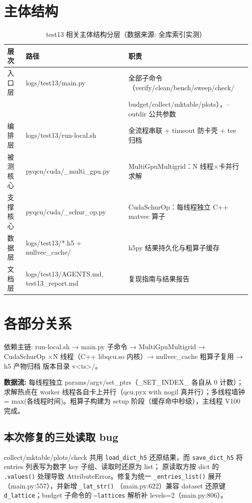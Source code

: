 \documentclass[UTF8]{ctexart}
\begin{document}
\section{主体结构}
\begin{table}[htbp]\centering
\begin{tabularx}{\textwidth}{llX}
\toprule
\textcolor{struct}{层次} & 路径 & \textcolor{struct}{职责} \\
\midrule
入口层 & logs/test13/main.py & 全部子命令（verify/clean/bench/sweep/check/\\
&& budget/collect/mktable/plots），--outdir 公共参数 \\
编排层 & logs/test13/run-local.sh & 全流程串联 + timeout 防卡壳 + tee 归档 \\
被测核心 & pyqcu/cuda/\_multi\_gpu.py & MultiGpuMultigrid：N 线程×卡并行求解 \\
支撑核心 & pyqcu/cuda/\_schur\_op.py & CudaSchurOp：每线程独立 C++ matvec 算子 \\
数据层 & logs/test13/*.h5 + nullvec\_cache/ & h5py 结果持久化与粗算子缓存 \\
文档层 & logs/test13/AGENTS.md, test13\_report.md & 复现指南与结果报告 \\
\bottomrule
\end{tabularx}
\caption{test13 相关主体结构分层（数据来源: 全库索引实测）}
\end{table}

\section{各部分关系}
\textcolor{relation}{依赖主链:} run-local.sh → main.py 子命令 → MultiGpuMultigrid →
CudaSchurOp ×N 线程（C++ libqcu.so 内核）→ nullvec\_cache 粗算子复用 → h5 产物归档
版本目录 v<ts>/。

\begin{keybox}
\textbf{数据流:} 每线程独立 params/argv/set\_ptrs（\_SET\_INDEX\_ 各自从 0 计数）；
求解热点在 worker 线程各自卡上并行（qcu.pyx with nogil 真并行）；多线程墙钟 =
max(各线程时间)。粗算子构建为 setup 阶段（缓存命中秒级），主线程 V100 完成。
\end{keybox}

\subsection{本次修复的三处读取 bug}
collect/mktable/plots/check 共用 \texttt{load\_dict\_h5} 还原结果，而
\texttt{save\_dict\_h5} 将 entries 列表写为数字 key 子组、读取时还原为 list；
原读取方按 dict 的 \texttt{.values()} 处理导致 AttributeError。修复为统一
\texttt{\_entries\_list()} 展开（main.py:557），并新增 \texttt{\_lat\_str()}
（main.py:622）兼容 dataset 还原键 \texttt{d\_lattice}；budget 子命令的
\texttt{--lattices} 解析补 levels=2（main.py:806）。
\end{document}
